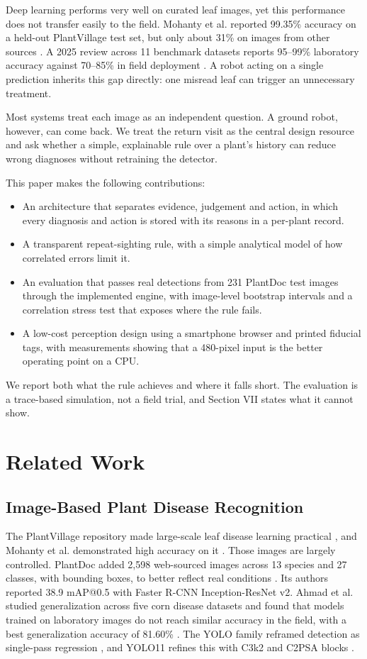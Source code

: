 \documentclass[conference]{IEEEtran}
\begin{document}
Deep learning performs very well on curated leaf images, yet this performance does not transfer easily to the field. Mohanty et al. reported 99.35\% accuracy on a held-out PlantVillage test set, but only about 31\% on images from other sources \cite{mohanty}. A 2025 review across 11 benchmark datasets reports 95--99\% laboratory accuracy against 70--85\% in field deployment \cite{shafay}. A robot acting on a single prediction inherits this gap directly: one misread leaf can trigger an unnecessary treatment.

Most systems treat each image as an independent question. A ground robot, however, can come back. We treat the return visit as the central design resource and ask whether a simple, explainable rule over a plant's history can reduce wrong diagnoses without retraining the detector.

This paper makes the following contributions:

\begin{itemize}
\item An architecture that separates evidence, judgement and action, in which every diagnosis and action is stored with its reasons in a per-plant record.
\item A transparent repeat-sighting rule, with a simple analytical model of how correlated errors limit it.
\item An evaluation that passes real detections from 231 PlantDoc test images through the implemented engine, with image-level bootstrap intervals and a correlation stress test that exposes where the rule fails.
\item A low-cost perception design using a smartphone browser and printed fiducial tags, with measurements showing that a 480-pixel input is the better operating point on a CPU.
\end{itemize}
We report both what the rule achieves and where it falls short. The evaluation is a trace-based simulation, not a field trial, and Section VII states what it cannot show.

\section{Related Work}
\subsection{Image-Based Plant Disease Recognition}
The PlantVillage repository made large-scale leaf disease learning practical \cite{hughes}, and Mohanty et al. demonstrated high accuracy on it \cite{mohanty}. Those images are largely controlled. PlantDoc added 2,598 web-sourced images across 13 species and 27 classes, with bounding boxes, to better reflect real conditions \cite{plantdoc}. Its authors reported 38.9 mAP@0.5 with Faster R-CNN Inception-ResNet v2. Ahmad et al. studied generalization across five corn disease datasets and found that models trained on laboratory images do not reach similar accuracy in the field, with a best generalization accuracy of 81.60\% \cite{ahmad}. The YOLO family reframed detection as single-pass regression \cite{redmon}, and YOLO11 refines this with C3k2 and C2PSA blocks \cite{khanam,ultralytics}.
\end{document}

